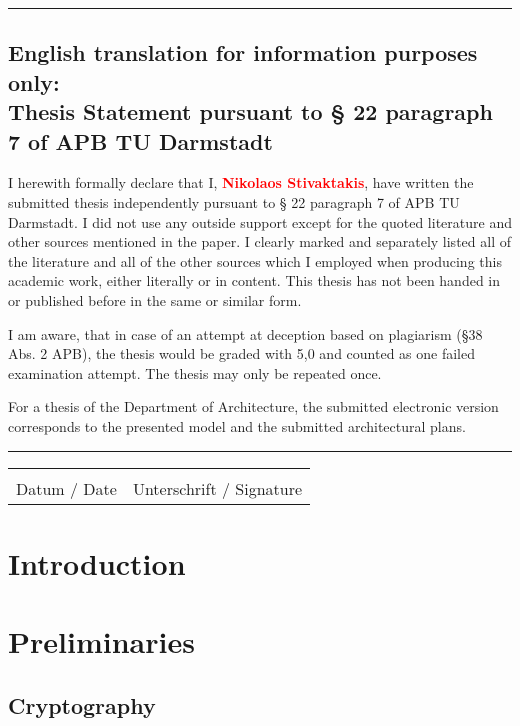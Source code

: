 \documentclass{cacthesis}
\begin{document}
	\vspace{10pt}
	\hrule
	
	\section*{English translation for information purposes only:\\Thesis Statement pursuant to § 22 paragraph 7 of APB TU Darmstadt}
	
	I herewith formally declare that I, \textcolor{red}{\textbf{Nikolaos Stivaktakis}}, have written the submitted thesis independently pursuant to § 22 paragraph 7 of APB TU Darmstadt. I did not use any outside support except for the quoted literature and other sources mentioned in the paper. I clearly marked and separately listed all of the literature and all of the other sources which I employed when producing this academic work, either literally or in content. This thesis has not been handed in or published before in the same or similar form.
	
	I am aware, that in case of an attempt at deception based on plagiarism (§38 Abs. 2 APB), the thesis would be graded with 5,0 and counted as one failed examination attempt. The thesis may only be repeated once.
	
	For a thesis of the Department of Architecture, the submitted electronic version corresponds to the presented model and the submitted architectural plans.
	
	\vspace{10pt}
	\hrule
	\vspace{70pt}
	
	\noindent\begin{tabular}{l@{\hskip 1in}l}
		\makebox[1.8in]{\hrulefill} & \makebox[3.5in]{\hrulefill}\\
		Datum / Date & Unterschrift / Signature
	\end{tabular}
	
	\tableofcontents
	
	\mainmatter
	
	\chapter{Introduction}

\chapter{Preliminaries}
\section{Cryptography}
\end{document}
